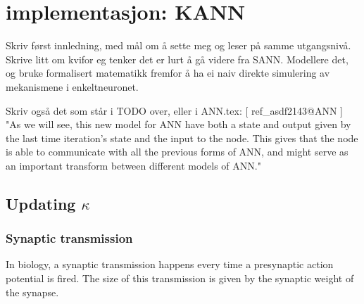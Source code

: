 %



\chapter{implementasjon: KANN}
	Skriv først innledning, med mål om å sette meg og leser på samme utgangsnivå.
	Skrive litt om kvifor eg tenker det er lurt å gå videre fra SANN.
	Modellere det, og bruke formalisert matematikk fremfor å ha ei naiv direkte simulering av mekanismene i enkeltneuronet.

	Skriv også det som står i TODO over, eller i ANN.tex: [ ref\_asdf2143@ANN ]%
	"As we will see, this new model for ANN have both a state and output given by the last time iteration's state and the input to the node. 
	This gives that the node is able to communicate with all the previous forms of ANN, and might serve as an important transform between different models of ANN."

	
	\section{Updating $\kappa$} %
		\subsection{Synaptic transmission}
			In biology, a synaptic transmission happens every time a presynaptic action potential is fired.
			The size of this transmission is given by the synaptic weight of the synapse.

